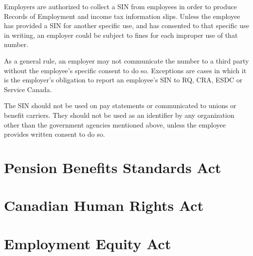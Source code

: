 \documentclass[letterpaper,10pt,english]{sphinxmanual}
\begin{document}
\sphinxAtStartPar
Employers are authorized to collect a SIN from employees in order to produce Records of
Employment and income tax information slips. Unless the employee has provided a SIN for
another specific use, and has consented to that specific use in writing, an employer could be
subject to fines for each improper use of that number.

\sphinxAtStartPar
As a general rule, an employer may not communicate the number to a third party without the
employee’s specific consent to do so. Exceptions are cases in which it is the employer’s
obligation to report an employee’s SIN to RQ, CRA, ESDC or Service Canada.

\sphinxAtStartPar
The SIN should not be used on pay statements or communicated to unions or benefit carriers.
They should not be used as an identifier by any organization other than the government
agencies mentioned above, unless the employee provides written consent to do so.


\section{Pension Benefits Standards Act}
\label{\detokenize{2_compliance:pension-benefits-standards-act}}

\section{Canadian Human Rights Act}
\label{\detokenize{2_compliance:canadian-human-rights-act}}

\section{Employment Equity Act}
\label{\detokenize{2_compliance:employment-equity-act}}
\end{document}
